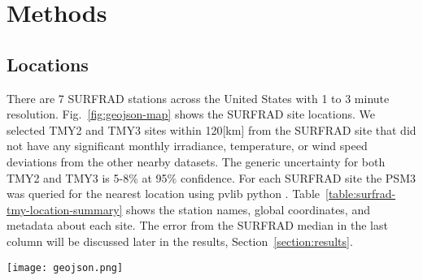 \documentclass[conference]{IEEEtran}
\begin{document}
\section{Methods}
\subsection{Locations}
There are 7 SURFRAD stations \cite{Augustine2000} across the United States with 1 to 3 minute resolution. Fig.~\ref{fig:geojson-map} shows the SURFRAD site locations. We selected TMY2 \cite{Marion1995} and TMY3 \cite{Wilcox2012} sites within 120[km] from the SURFRAD site that did not have any significant monthly irradiance, temperature, or wind speed deviations from the other nearby datasets. The generic uncertainty for both TMY2 and TMY3 is 5-8\% at 95\% confidence. For each SURFRAD site the PSM3 was queried for the nearest location using pvlib python \cite{F.Holmgren2018}. Table~\ref{table:surfrad-tmy-location-summary} shows the station names, global coordinates, and metadata about each site. The error from the SURFRAD median in the last column will be discussed later in the results, Section~\ref{section:results}.

\begin{figure*}[htbp]
\centerline{\texttt{[image: geojson.png]}}
\caption{Map of SURFRAD sites and selected nearby TMY2 and TMY3 sites for comparison.}
\label{fig:geojson-map}
\end{figure*}
\end{document}
